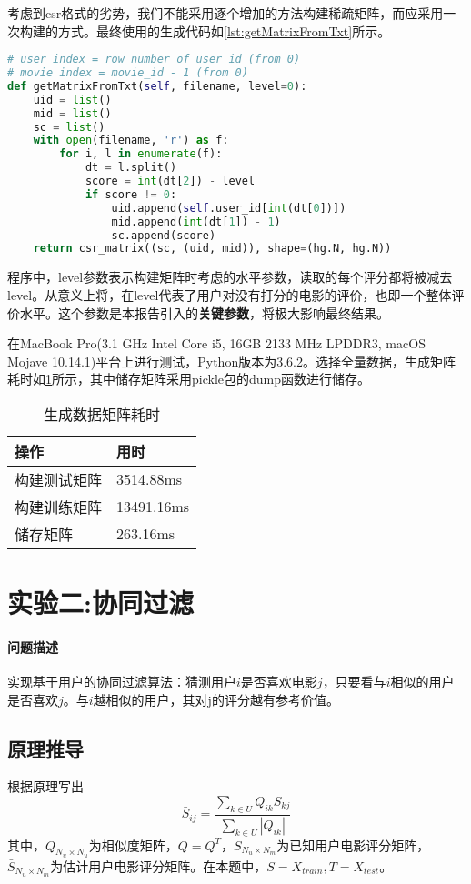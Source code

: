 \documentclass[a4paper,12pt]{article}
\begin{document}
    考虑到csr格式的劣势，我们不能采用逐个增加的方法构建稀疏矩阵，而应采用一次构建的方式。最终使用的生成代码如\cref{lst:getMatrixFromTxt}所示。
    \begin{lstlisting}[language=python,caption={getMatrixFromTxt},label=lst:getMatrixFromTxt]
# user index = row_number of user_id (from 0)
# movie index = movie_id - 1 (from 0)
def getMatrixFromTxt(self, filename, level=0):
    uid = list()
    mid = list()
    sc = list()
    with open(filename, 'r') as f:
        for i, l in enumerate(f):
            dt = l.split()
            score = int(dt[2]) - level
            if score != 0:
                uid.append(self.user_id[int(dt[0])])
                mid.append(int(dt[1]) - 1)
                sc.append(score)
    return csr_matrix((sc, (uid, mid)), shape=(hg.N, hg.N))
    \end{lstlisting}

    程序中，level参数表示构建矩阵时考虑的水平参数，读取的每个评分都将被减去level。从意义上将，在level代表了用户对没有打分的电影的评价，也即一个整体评价水平。这个参数是本报告引入的\textbf{关键参数}，将极大影响最终结果。

    在MacBook Pro(3.1 GHz Intel Core i5, 16GB 2133 MHz LPDDR3, macOS Mojave 10.14.1)平台上进行测试，Python版本为3.6.2。选择全量数据，生成矩阵耗时如\cref{tbl:exp1}所示，其中储存矩阵采用pickle包的dump函数进行储存。
    \begin{table}
      \centering
      \caption{生成数据矩阵耗时}
      \label{tbl:exp1}
      \begin{tabular}{ll}
        \toprule
        操作&用时\\
        \midrule
        构建测试矩阵&3514.88ms\\
        构建训练矩阵&13491.16ms\\
        储存矩阵&263.16ms\\
        \bottomrule
      \end{tabular}
    \end{table}
    \section{实验二:协同过滤}
    \paragraph{问题描述}
    实现基于用户的协同过滤算法：猜测用户$i$是否喜欢电影$j$，只要看与$i$相似的用户是否喜欢$j$。与$i$越相似的用户，其对j的评分越有参考价值。
    \subsection{原理推导}
    根据原理写出
    \begin{equation}
      \bar S_{ij} = \frac{\sum\limits_{k\in U} Q_{ik}S_{kj}}{\sum\limits_{k\in U} |Q_{ik}|}
    \end{equation}
    其中，$Q_{N_u\times N_u}$为相似度矩阵，$Q=Q^T$，$S_{N_u\times N_m}$为已知用户电影评分矩阵，$\bar S_{N_u\times N_m}$为估计用户电影评分矩阵。在本题中，$S=X_{train}, T=X_{test}$。
\end{document}
